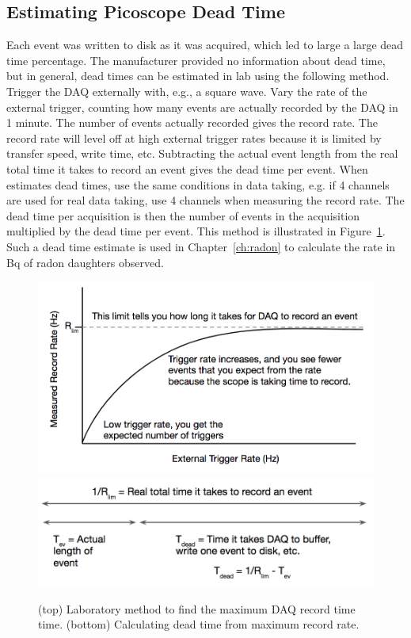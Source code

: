 \subsection{Estimating Picoscope Dead Time}
Each event was written to disk as it was acquired, which led to large a large dead time percentage. The manufacturer provided no information about dead time, but in general, dead times can be estimated in lab using the following method. Trigger the DAQ externally with, e.g., a square wave. Vary the rate of the external trigger, counting how many events are actually recorded by the DAQ in 1 minute. The number of events actually recorded gives the record rate. The record rate will level off at high external trigger rates because it is limited by transfer speed, write time, etc. Subtracting the actual event length from the real total time it takes to record an event gives the dead time per event. When estimates dead times, use the same conditions in data taking, e.g. if 4 channels are used for real data taking, use 4 channels when measuring the record rate. The dead time per acquisition is then the number of events in the acquisition multiplied by the dead time per event. This method is illustrated in Figure~\ref{fig:deadtime}. Such a dead time estimate is used in Chapter~\ref{ch:radon} to calculate the rate in Bq of radon daughters observed.

 \begin{figure}[htbp]
\begin{center}
\includegraphics[width =\textwidth ]{figures/testbed/deadtime_plot.png}
\includegraphics[width =\textwidth]{figures/testbed/deadtime_math.png}
\caption{(top) Laboratory method to find the maximum \ac{DAQ} record time time. (bottom) Calculating dead time from maximum record rate.}
\label{fig:deadtime}
\end{center}
\end{figure}


